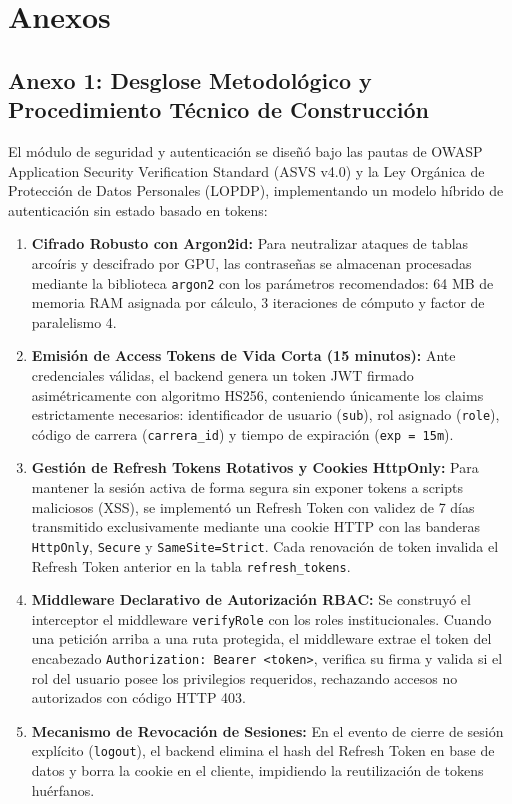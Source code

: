 \documentclass[12pt,a4paper]{article}
\begin{document}
\vspace{0.4cm}

\section{Anexos}

\subsection*{Anexo 1: Desglose Metodológico y Procedimiento Técnico de Construcción}
El módulo de seguridad y autenticación se diseñó bajo las pautas de OWASP Application Security Verification Standard (ASVS v4.0) y la Ley Orgánica de Protección de Datos Personales (LOPDP), implementando un modelo híbrido de autenticación sin estado basado en tokens:

\begin{enumerate}[leftmargin=1.5em, itemsep=3pt]
    \item \textbf{Cifrado Robusto con Argon2id:} Para neutralizar ataques de tablas arcoíris y descifrado por GPU, las contraseñas se almacenan procesadas mediante la biblioteca \texttt{argon2} con los parámetros recomendados: 64 MB de memoria RAM asignada por cálculo, 3 iteraciones de cómputo y factor de paralelismo 4.
    \item \textbf{Emisión de Access Tokens de Vida Corta (15 minutos):} Ante credenciales válidas, el backend genera un token JWT firmado asimétricamente con algoritmo HS256, conteniendo únicamente los claims estrictamente necesarios: identificador de usuario (\texttt{sub}), rol asignado (\texttt{role}), código de carrera (\texttt{carrera\_\allowbreak  id}) y tiempo de expiración (\texttt{exp = 15m}).
    \item \textbf{Gestión de Refresh Tokens Rotativos y Cookies HttpOnly:} Para mantener la sesión activa de forma segura sin exponer tokens a scripts maliciosos (XSS), se implementó un Refresh Token con validez de 7 días transmitido exclusivamente mediante una cookie HTTP con las banderas \texttt{HttpOnly}, \texttt{Secure} y \texttt{SameSite=Strict}. Cada renovación de token invalida el Refresh Token anterior en la tabla \texttt{refresh\_\allowbreak  tokens}.
    \item \textbf{Middleware Declarativo de Autorización RBAC:} Se construyó el interceptor el middleware \texttt{verifyRole} con los roles institucionales. Cuando una petición arriba a una ruta protegida, el middleware extrae el token del encabezado \texttt{Authorization: Bearer <token>}, verifica su firma y valida si el rol del usuario posee los privilegios requeridos, rechazando accesos no autorizados con código HTTP 403.
    \item \textbf{Mecanismo de Revocación de Sesiones:} En el evento de cierre de sesión explícito (\texttt{logout}), el backend elimina el hash del Refresh Token en base de datos y borra la cookie en el cliente, impidiendo la reutilización de tokens huérfanos.
\end{enumerate}
\end{document}
